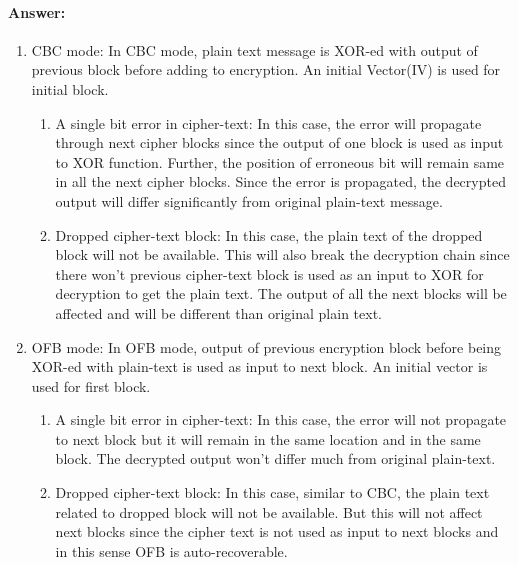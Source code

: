 \documentclass{article}
\begin{document}
    \paragraph{Answer: \newline}
        \begin{enumerate}
            \item CBC mode: In CBC mode, plain text message is XOR-ed with output of previous block before adding to encryption. An initial Vector(IV) is used for initial block. 
                \begin{enumerate}
                    \item A single bit error in cipher-text: \newline
                    In this case, the error will propagate through next cipher blocks since the output of one block is used as input to XOR function. Further, the position of erroneous bit will remain same in all the next cipher blocks. Since the error is propagated, the decrypted output will differ significantly from original plain-text message.
                    \item Dropped cipher-text block:\newline
                    In this case, the plain text of the dropped block will not be available. This will also break the decryption chain since there won't previous cipher-text block is used as an input to XOR for decryption to get the plain text. The output of all the next blocks will be affected and will be different than original plain text.
                \end{enumerate}
            \item OFB mode: In OFB mode, output of previous encryption block before being XOR-ed with plain-text is used as input to next block. An initial vector is used for first block.
                \begin{enumerate}
                    \item A single bit error in cipher-text:\newline
                    In this case, the error will not propagate to next block but it will remain in the same location and in the same block. The decrypted output won't differ much from original plain-text.
                    \item Dropped cipher-text block: \newline
                    In this case, similar to CBC, the plain text related to dropped block will not be available. But this will not affect next blocks since the cipher text is not used as input to next blocks and in this sense OFB is auto-recoverable.

\end{enumerate}
\end{enumerate}
\end{document}
